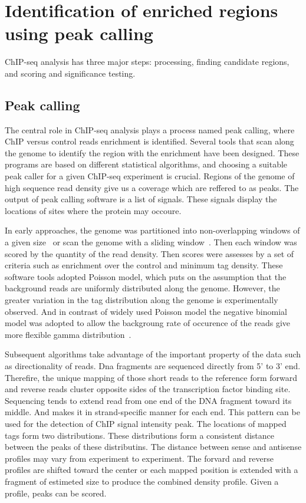 \chapter{Identification of enriched regions using peak calling}

ChIP-seq analysis has three major steps: processing, finding candidate regions, and scoring and significance testing.



\section{Peak calling}
The central role in ChIP-seq analysis plays a process named peak calling, where ChIP versus control reads enrichment is identified.
Several tools that scan along the genome to identify the region with the enrichment have been designed.
These programs are based on different statistical algorithms, and choosing a suitable peak caller for a given ChIP-seq experiment is crucial.
Regions of the genome of high sequence read density give us a coverage which are reffered to as peaks.
The output of peak calling software is a list of signals.
These signals display the locations of sites where the protein may occoure.

In early approaches, the genome was partitioned into non-overlapping  windows of a given size~\cite{Zang-2009} or scan the genome with a sliding window~\cite{Xu-2010}.
Then each window was scored by the quantity of the read density. 
Then scores were assesses by a set of criteria such as enrichment over the control and minimum tag density.
These software tools adopted Poisson model, which puts on the assumption that the background reads are uniformly distributed along the genome.
However, the greater variation in the tag distribution along the genome is experimentally observed.
And in contrast of widely used Poisson model the negative binomial model was adopted to allow the backgroung rate of occurence of the reads give more flexible gamma distribution~\cite{ji2008integrated}.

Subsequent algorithms take advantage of the important property of the data such as directionality of reads.
Dna fragments are sequenced directly from 5' to 3' end.
Therefire, the unique mapping of those short reads to the reference form forward and reverse reads cluster opposite sides of the transcription factor binding site.
Sequencing tends to extend read from one end of the DNA fragment toward its middle.
And makes it in strand-specific manner for each end. 
This pattern can be used for the detection of ChIP signal intensity peak.
The locations of mapped tags form two distributions.
These distributions form a consistent distance between the peaks of these distributins.
The distance between sense and antisense profiles may vary from experiment to experiment.
The forvard and reverse profiles are shifted toward the center or each mapped position is extended with a fragment of estimeted size to produce the combined density profile.
Given a profile, peaks can be scored.

